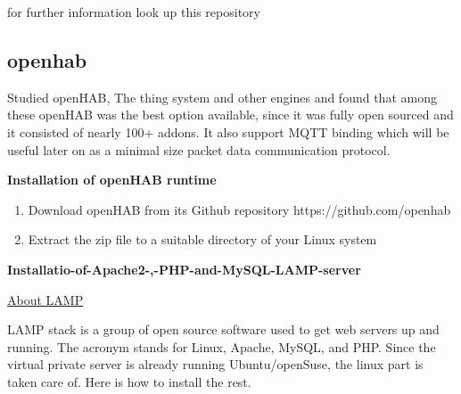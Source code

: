 \documentclass[16pt]{article}
\begin{document}
for further information look up this repository 
  
\hfill

\subsection{openhab}


Studied openHAB, The thing system and other engines and found that among these openHAB was the best option available, since it was fully open sourced and it
consisted of nearly 100+ addons. It also support MQTT binding which will be useful later on as a minimal size packet data communication protocol.

\hfill

\textbf{Installation of openHAB runtime}

\begin{enumerate}

  \item Download openHAB from its Github repository https://github.com/openhab
  \item Extract the zip file to a suitable directory of your Linux system

  \end{enumerate}
  
\hfill

{\Large\item\textbf{Installatio-of-Apache2-,-PHP-and-MySQL-LAMP-server}} 

\vspace{0.5cm}

{\underline{\Large{About LAMP}}}

  LAMP stack is a group of open source software used to get web servers up
  and running. The acronym stands for Linux, Apache, MySQL, and PHP. Since
  the virtual private server is already running Ubuntu/openSuse, the linux
  part is taken care of. Here is how to install the rest.
\end{document}
